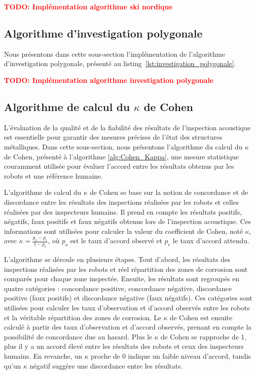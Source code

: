 \documentclass[francais,RandD]{rapportPFE}
\newcommand{\TODO}[1]{\textcolor{red}{\textbf{TODO: #1}}}
\begin{document}
			\TODO{Implémentation algorithme ski nordique}
		\subsection*{Algorithme d'investigation polygonale}
			Nous présentons dans cette sous-section l'implémentation de l'algorithme d'investigation polygonale, présenté au listing~\ref{lst:investigation_polygonale}.

			\TODO{Implémentation algorithme investigation polygonale}
		\subsection*{Algorithme de calcul du $\kappa$ de Cohen}
			L'évaluation de la qualité et de la fiabilité des résultats de l'inspection acoustique est essentielle pour garantir des mesures précises de l'état des structures métalliques.
			Dans cette sous-section, nous présentons l'algorithme du calcul du $\kappa$ de Cohen, présenté à l'algorithme \ref{alg:Cohen_Kappa}, une mesure statistique couramment utilisée pour évaluer l'accord entre les résultats obtenus par les robots et une référence humaine.

			L'algorithme de calcul du $\kappa$ de Cohen se base sur la notion de concordance et de discordance entre les résultats des inspections réalisées par les robots et celles réalisées par des inspecteurs humains.
			Il prend en compte les résultats positifs, négatifs, faux positifs et faux négatifs obtenus lors de l'inspection acoustique.
			Ces informations sont utilisées pour calculer la valeur du coefficient de Cohen, noté $\kappa$, avec $\kappa = \frac{p_o - p_e}{1 - p_e}$, où $p_o$ est le taux d'accord observé et $p_e$ le taux d'accord attendu.

			L'algorithme se déroule en plusieurs étapes.
			Tout d'abord, les résultats des inspections réalisées par les robots et réel répartition des zones de corrosion sont comparés pour chaque zone inspectée.
			Ensuite, les résultats sont regroupés en quatre catégories : concordance positive, concordance négative, discordance positive (faux positifs) et discordance négative (faux négatifs).
			Ces catégories sont utilisées pour calculer les taux d'observation et d'accord observés entre les robots et la véritable répartition des zones de corrosion.
			Le $\kappa$ de Cohen est ensuite calculé à partir des taux d'observation et d'accord observés, prenant en compte la possibilité de concordance due au hasard.
			Plus le $\kappa$ de Cohen se rapproche de 1, plus il y a un accord élevé entre les résultats des robots et ceux des inspecteurs humains.
			En revanche, un $\kappa$ proche de 0 indique un faible niveau d'accord, tandis qu'un $\kappa$ négatif suggère une discordance entre les résultats.
\end{document}
